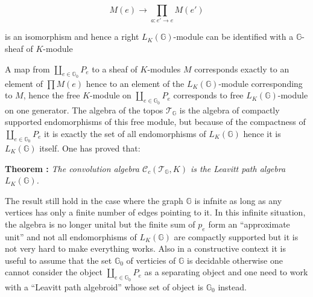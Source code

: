 \documentclass[a4paper]{article}
\newcommand{\G}{\mathbb{G}}
\newcommand{\Tcal}{\mathcal{T}}
\newcommand{\Ccal}{\mathcal{C}}
\newcommand{\Th}[1]
	{
	\bigskip	
	\textbf{Theorem : }{\itshape #1}
		
	\bigskip
	}
\begin{document}
{\[ M(e) \rightarrow \prod_{ a: e' \rightarrow e} M(e') \]

is an isomorphism and hence a right $L_K(\G)$-module can be identified with a $\G$-sheaf of $K$-module


\bigskip

A map from $\coprod_{e \in \G_0} P_e$ to a sheaf of $K$-modules $M$ corresponds exactly to an element of $\prod M(e)$ hence to an element of the $L_K(\G)$-module corresponding to $M$, hence the free $K$-module on $\coprod_{e \in \G_0} P_e$ corresponds to free $L_K(\G)$-module on one generator. The algebra of the topos $\Tcal_{\G}$ is the algebra of compactly supported endomorphisms of this free module, but because of the compactness of $\coprod_{e \in \G_0} P_e$ it is exactly the set of all endomorphisms of $L_K(\G)$ hence it is $L_K(\G)$ itself. One has proved that:

\Th{The convolution algebra $\Ccal_c(\Tcal_{\G},K)$ is the Leavitt path algebra $L_K(\G)$.}

The result still hold in the case where the graph $\G$ is infnite as long as any vertices has only a finite number of edges pointing to it. In this infinite situation, the algebra is no longer unital but the finite sum of $p_e$ form an ``approximate unit'' and not all endomorphisms of $L_K(\G)$ are compactly supported but it is not very hard to make everything works. Also in a constructive context it is useful to assume that the set $\G_0$ of verticies of $\G$ is decidable otherwise one cannot consider the object $\coprod_{e \in \G_0} P_e$ as a separating object and one need to work with a ``Leavitt path algebroid'' whose set of object is $\G_0$ instead.

}



{}

\end{document}
